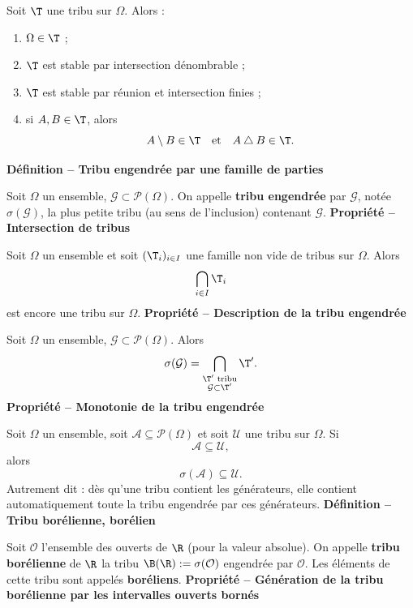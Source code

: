 Soit $\T$ une tribu sur $\Omega$. Alors :
\begin{enumerate}
\item $\Omega\in\T$ ;
\item $\T$ est stable par intersection dénombrable ;
\item $\T$ est stable par réunion et intersection finies ;
\item si $A,B\in\T$, alors
\[A\setminus B\in\T\quad\text{et}\quad A\mathbin{\triangle}B\in\T.\]
\end{enumerate}
\textbf{Définition – Tribu engendrée par une famille de parties}

Soit $\Omega$ un ensemble, $\mathcal G\subset\mathcal P(\Omega)$. On appelle \textbf{tribu engendrée} par $\mathcal G$, notée $\sigma(\mathcal G)$, la plus petite tribu (au sens de l’inclusion) contenant $\mathcal G$.
\textbf{Propriété – Intersection de tribus}

Soit $\Omega$ un ensemble et soit $(\T_i)_{i\in I}$ une famille non vide de tribus sur $\Omega$. Alors
\[\bigcap_{i\in I}\T_i\]
est encore une tribu sur $\Omega$.
\textbf{Propriété – Description de la tribu engendrée}

Soit $\Omega$ un ensemble, $\mathcal G\subset\mathcal P(\Omega)$. Alors
\[\sigma(\mathcal G)=\bigcap_{\substack{\T'\text{ tribu}\\\mathcal G\subset\T'}}\T'.\]
\textbf{Propriété – Monotonie de la tribu engendrée}

Soit $\Omega$ un ensemble, soit $\mathcal A\subseteq\mathcal P(\Omega)$ et soit $\mathcal U$ une tribu sur $\Omega$. Si
\[\mathcal A\subseteq\mathcal U,\]
alors
\[\sigma(\mathcal A)\subseteq\mathcal U.\]
Autrement dit : dès qu’une tribu contient les générateurs, elle contient automatiquement toute la tribu engendrée par ces générateurs.
\textbf{Définition – Tribu borélienne, borélien}

Soit $\mathcal O$ l’ensemble des ouverts de $\R$ (pour la valeur absolue). On appelle \textbf{tribu borélienne} de $\R$ la tribu $\B(\R):=\sigma(\mathcal O)$ engendrée par $\mathcal O$. Les éléments de cette tribu sont appelés \textbf{boréliens}.
\textbf{Propriété – Génération de la tribu borélienne par les intervalles ouverts bornés}

